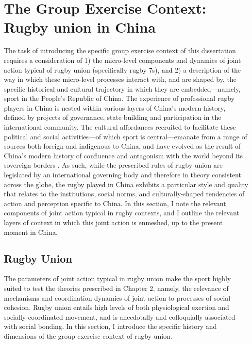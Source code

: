\section{The Group Exercise Context: Rugby union in China}
The task of introducing the specific group exercise context of this dissertation requires a consideration of 1) the micro-level components and dynamics of joint action typical of rugby union (specifically rugby 7s), and 2) a description of the way in which these micro-level processes interact with, and are shaped by, the specific historical and cultural trajectory in which they are embedded---namely, sport in the People's Republic of China.  The experience of professional rugby players in China is nested within various layers of China's modern history, defined by projects of governance, state building and participation in the international community.  The cultural affordances recruited to facilitate these political and social activities---of which sport is central---emanate from a range of sources both foreign and indigenous to China, and have evolved as the result of China's modern history of confluence and antagonism with the world beyond its sovereign borders \citep{SOURCE}.  As such, while the prescribed rules of rugby union are legislated by an international governing body and therefore in theory consistent across the globe, the rugby played in China exhibits a particular style and quality that relates to the institutions, social norms, and culturally-shaped tendencies of action and perception specific to China. In this section, I note the relevant components of joint action typical in rugby contexts, and I outline the relevant layers of context in which this joint action is enmeshed, up to the present moment in China.

  \subsection{Rugby Union}

The parameters of joint action typical in rugby union make the sport highly suited to test the theories prescribed in Chapter 2, namely, the relevance of mechanisms and coordination dynamics of joint action to processes of social cohesion.  Rugby union entails high levels of both physiological exertion and socially-coordinated movement, and is anecdotally and colloquially associated with social bonding.  In this section, I introduce the specific history and dimensions of the group exercise context of rugby union.

